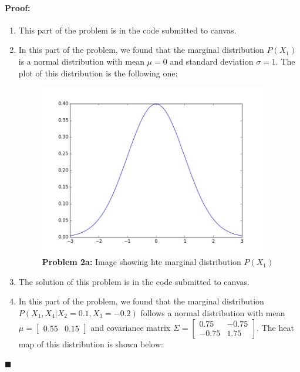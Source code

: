 \documentclass[12pt]{article}
\newenvironment{proof}{\paragraph{Proof: }}{\hfill$\blacksquare$}
\begin{document}
\begin{proof}
\begin{enumerate}
\item This part of the problem is in the code submitted to canvas.

\item In this part of the problem, we found that the marginal distribution $P(X_1)$ is a normal distribution with mean $\mu = 0$ and standard deviation $\sigma = 1$. The plot of this distribution is the following one:

\begin{figure}[!htbp]
\centering
\includegraphics[width=10cm]{hw_p2_marginal_distribution.jpg}
\caption{\textbf{Problem 2a:} Image showing hte marginal distribution $P(X_1)$}
\end{figure}

\item The solution of this problem is in the code submitted to canvas.

\item In this part of the problem, we found that the marginal distribution $P(X_1,X_4|X_2 = 0.1,X_3 = -0.2)$ follows a normal distribution with mean $\mu = \left[ \begin{matrix} 0.55 & 0.15 \end{matrix}\right]$ and covariance matrix $\Sigma = \left[ \begin{matrix}0.75 & -0.75 \\ -0.75 & 1.75 \end{matrix}\right]$. The heat map of this distribution is shown below:


\end{enumerate}
\end{proof}
\end{document}
